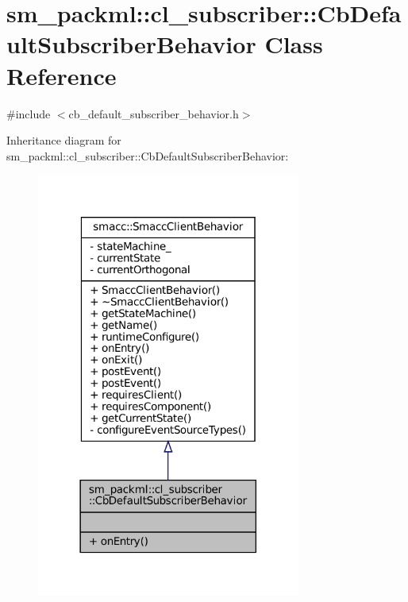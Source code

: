 \hypertarget{classsm__packml_1_1cl__subscriber_1_1CbDefaultSubscriberBehavior}{}\section{sm\+\_\+packml\+:\+:cl\+\_\+subscriber\+:\+:Cb\+Default\+Subscriber\+Behavior Class Reference}
\label{classsm__packml_1_1cl__subscriber_1_1CbDefaultSubscriberBehavior}


{\ttfamily \#include $<$cb\+\_\+default\+\_\+subscriber\+\_\+behavior.\+h$>$}



Inheritance diagram for sm\+\_\+packml\+:\+:cl\+\_\+subscriber\+:\+:Cb\+Default\+Subscriber\+Behavior\+:
\nopagebreak
\begin{figure}[H]
\begin{center}
\leavevmode
\includegraphics[width=246pt]{classsm__packml_1_1cl__subscriber_1_1CbDefaultSubscriberBehavior__inherit__graph}
\end{center}
\end{figure}


